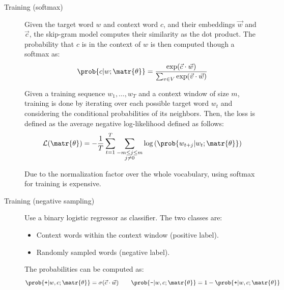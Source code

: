 \begin{description}
\begin{description}
                \begin{description}
                    \item[Training (softmax)]
                        Given the target word $w$ and context word $c$, and their embeddings $\vec{w}$ and $\vec{c}$, the skip-gram model computes their similarity as the dot product. The probability that $c$ is in the context of $w$ is then computed though a softmax as:
                        \[ 
                            \prob{c | w; \matr{\theta}} = \frac{\exp(\vec{c} \cdot \vec{w})}{\sum_{v \in V} \exp(\vec{v} \cdot \vec{w})}
                        \]

                        Given a training sequence $w_1, \dots, w_T$ and a context window of size $m$, training is done by iterating over each possible target word $w_t$ and considering the conditional probabilities of its neighbors. Then, the loss is defined as the average negative log-likelihood defined as follows:
                        \[
                            \begin{split}
                                \mathcal{L}(\matr{\theta}) = -\frac{1}{T} \sum_{t=1}^{T} \sum\limits_{\substack{-m \leq j \leq m\\j \neq 0}} \log\left( \prob{w_{t+j} | w_t; \matr{\theta}} \right)
                            \end{split}
                        \]

                        \begin{remark}
                            Due to the normalization factor over the whole vocabulary, using softmax for training is expensive.
                        \end{remark}

                    \item[Training (negative sampling)] 
                        Use a binary logistic regressor as classifier. The two classes are:
                        \begin{itemize}
                            \item Context words within the context window (positive label).
                            \item Randomly sampled words (negative label).
                        \end{itemize} 
                        The probabilities can be computed as:
                        \[ 
                            \prob{\texttt{+} | w, c; \matr{\theta}} = \sigma(\vec{c} \cdot \vec{w}) 
                            \qquad
                            \prob{\texttt{-} | w, c; \matr{\theta}} = 1 - \prob{\texttt{+} | w, c; \matr{\theta}}
                        \]


\end{description}
\end{description}
\end{description}
